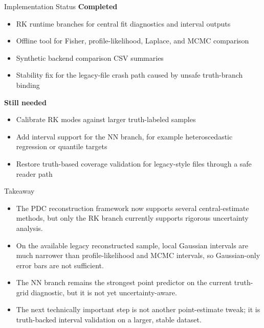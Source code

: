 \documentclass[aspectratio=169]{beamer}
\begin{document}
\begin{frame}{Implementation Status}
\small
\textbf{Completed}
\begin{itemize}
\item RK runtime branches for central fit diagnostics and interval outputs
\item Offline tool for Fisher, profile-likelihood, Laplace, and MCMC comparison
\item Synthetic backend comparison CSV summaries
\item Stability fix for the legacy-file crash path caused by unsafe truth-branch binding
\end{itemize}

\vspace{0.2cm}
\textbf{Still needed}
\begin{itemize}
\item Calibrate RK modes against larger truth-labeled samples
\item Add interval support for the NN branch, for example heteroscedastic regression or quantile targets
\item Restore truth-based coverage validation for legacy-style files through a safe reader path
\end{itemize}
\end{frame}

\begin{frame}{Takeaway}
\small
\begin{itemize}
\item The PDC reconstruction framework now supports several central-estimate methods, but only the RK branch currently supports rigorous uncertainty analysis.
\item On the available legacy reconstructed sample, local Gaussian intervals are much narrower than profile-likelihood and MCMC intervals, so Gaussian-only error bars are not sufficient.
\item The NN branch remains the strongest point predictor on the current truth-grid diagnostic, but it is not yet uncertainty-aware.
\item The next technically important step is not another point-estimate tweak; it is truth-backed interval validation on a larger, stable dataset.
\end{itemize}
\end{frame}
\end{document}
